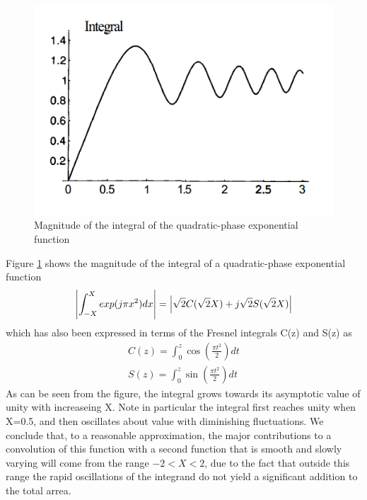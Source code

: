 \documentclass[../main.tex]{subfiles}
\begin{document}
	\begin{figure}[h!]
	  \centering
	  \includegraphics[scale=0.5]{../graphics/Wave_optics8.png}
	  \caption{Magnitude of the integral of the quadratic-phase exponential function}
	  \label{fig:Magnitude}
	\end{figure}

	Figure \ref{fig:Magnitude} shows the magnitude of the integral of a quadratic-phase exponential function
	\begin{equation}
	\left\lvert\int^X_{-X}{exp(j\pi x^2)dx}\right\rvert=\left\lvert\sqrt{2}C(\sqrt{2}X)+j\sqrt{2}S(\sqrt{2}X)\right\rvert
	\end{equation}
	which has also been expressed in terms of the Fresnel integrals C(z) and S(z) as
	\begin{align}
	C(z)=\int_0^z{\cos(\frac{\pi t^2}{2})}dt\\
	S(z)=\int_0^z{\sin(\frac{\pi t^2}{2})}dt
	\end{align}
	As can be seen from the figure, the integral grows towards its asymptotic value of unity with increaseing X. Note in particular the integral first reaches unity when X=0.5, and then oscillates about value with diminishing fluctuations. We conclude that, to a reasonable approximation, the major contributions to a convolution of this function with a second function that is smooth and slowly varying will come from the range $-2<X<2$, due to the fact that outside this range the rapid oscillations of the integrand do not yield a significant addition to the total arrea.
\end{document}
